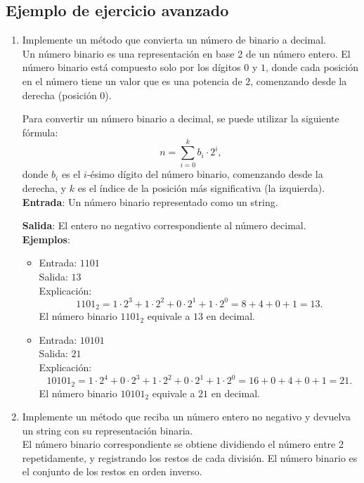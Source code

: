 \documentclass{article}
\begin{document}
\subsection*{Ejemplo de ejercicio avanzado}

\begin{enumerate}[label=\alph*)]
    \item Implemente un método que convierta un número de binario a decimal.\\
    Un número binario es una representación en base 2 de un número entero. El número binario está compuesto solo por los dígitos \(0\) y \(1\), donde cada posición en el número tiene un valor que es una potencia de 2, comenzando desde la derecha (posición 0).

    Para convertir un número binario a decimal, se puede utilizar la siguiente fórmula:
    \[
    n = \sum_{i=0}^{k} b_i \cdot 2^i,
    \]
    donde \(b_i\) es el \(i\)-ésimo dígito del número binario, comenzando desde la derecha, y \(k\) es el índice de la posición más significativa (la izquierda).\\

    \textbf{Entrada}: Un número binario representado como un string.

    \textbf{Salida}: El entero no negativo correspondiente al número decimal.\\

    \textbf{Ejemplos}:
    \begin{itemize}
        \item Entrada: \( \text{1101} \) \\
        Salida: \( 13 \) \\
        Explicación:
        \[
        1101_2 = 1 \cdot 2^3 + 1 \cdot 2^2 + 0 \cdot 2^1 + 1 \cdot 2^0 = 8 + 4 + 0 + 1 = 13.
        \]
        El número binario \(1101_2\) equivale a \(13\) en decimal.

        \item Entrada: \( \text{10101} \) \\
        Salida: \( 21 \) \\
        Explicación:
        \[
        10101_2 = 1 \cdot 2^4 + 0 \cdot 2^3 + 1 \cdot 2^2 + 0 \cdot 2^1 + 1 \cdot 2^0 = 16 + 0 + 4 + 0 + 1 = 21.
        \]
        El número binario \(10101_2\) equivale a \(21\) en decimal.
    \end{itemize}

    \item Implemente un método que reciba un número entero no negativo y devuelva un string con su representación binaria.\\
    El número binario correspondiente se obtiene dividiendo el número entre 2 repetidamente, y registrando los restos de cada división. El número binario es el conjunto de los restos en orden inverso.\\


\end{enumerate}
\end{document}
